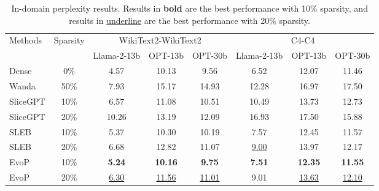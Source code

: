 \begin{table*}[t]
\centering
\begin{tabular}{lccccccc}
\toprule
\multirow{2}{*}{Methods} & \multirow{2}{*}{Sparsity} & \multicolumn{3}{c}{WikiText2-WikiText2} & \multicolumn{3}{c}{C4-C4} \\
& & Llama-2-13b & OPT-13b & OPT-30b & Llama-2-13b & OPT-13b & OPT-30b \\
\midrule
Dense & 0\% & 4.57 & 10.13 & 9.56 & 6.52 & 12.07 & 11.46 \\ \hline
Wanda & 50\% & 7.93 & 15.17 & 14.93 & 12.28 & 16.97 & 17.50 \\ 
SliceGPT & 10\% & 6.57 & 11.08 & 10.51 & 10.49 & 13.73 & 12.73 \\
SliceGPT & 20\% & 10.26 & 13.19 & 12.09 & 16.93 & 17.50 & 15.88 \\ 
SLEB & 10\% & 5.37 & 10.30 & 10.19 & 7.57 & 12.45 & 11.57 \\
SLEB & 20\% & 6.68 & 12.82 & 11.07 &  \underline{9.00} & 13.97 & 12.17\\
\midrule
EvoP & 10\% & \textbf{5.24} &  \textbf{10.16} &  \textbf{9.75} &  \textbf{7.51} &  \textbf{12.35} &  \textbf{11.55} \\
EvoP & 20\% &  \underline{6.30} &  \underline{11.56} &  \underline{11.01} & 9.01 &  \underline{13.63} &  \underline{12.10} \\
\bottomrule
\end{tabular}
\caption{In-domain perplexity results. Results in \textbf{bold} are the best performance with 10\% sparsity, and results in \underline{underline} are the best performance with 20\% sparsity.}
\label{tab-id-ppl}
\end{table*}

